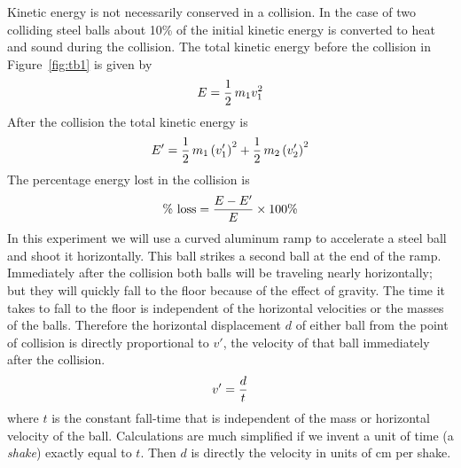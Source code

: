      Kinetic energy is not necessarily conserved in a collision.  In the
case of two colliding steel balls about 10\% of the initial kinetic
energy is converted to heat and sound during the collision.  The total
kinetic energy before the collision in Figure~\ref{fig:tb1} is given by
\begin{equation}
E = {{1} \over {2}} \, m_1 v_{1}^{2}  \label{eq:tb3}
\end{equation}
 After the collision the total kinetic energy is
\begin{equation}
E' = {{1} \over {2}} \, m_1 \left( v_{1}' \right)^{2} + {{1} \over {2}} \,
      m_2 \left( v_{2}' \right)^{2}  \label{eq:tb4}
\end{equation}
 The percentage energy lost in the collision is
\begin{equation}
\mbox{\% loss} = {{E - E'} \over {E}} \times 100\%  \label{eq:tb5}
\end{equation}
     In this experiment we will use a curved aluminum ramp to accelerate
a steel ball and shoot it horizontally.  This ball strikes a second ball
at the end of the ramp.  Immediately after the collision both balls will
be traveling nearly horizontally; but they will quickly fall to the
floor because of the effect of gravity.  The time it takes to fall to
the floor is independent of the horizontal velocities or the masses of
the balls.  Therefore the horizontal displacement $d$ of either ball from
the point of collision is directly proportional to $v'$, the velocity of
that ball immediately after the collision.
\begin{equation}
v' = {d\over t}  \label{eq:tb6}
\end{equation}
where $t$ is the constant fall-time that 
is independent of the mass or horizontal velocity of the ball.
Calculations are much simplified if we invent a unit of time
(a {\em shake}) exactly equal to $t$.  Then $d$ is directly the
velocity in units of cm per shake.



